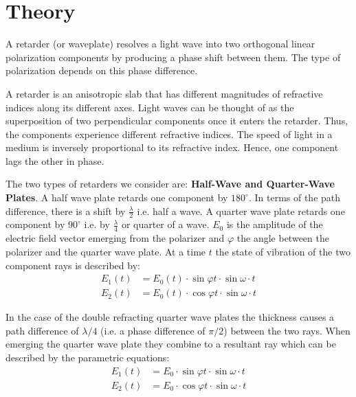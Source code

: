 \documentclass{article}
\begin{document}
\section{Theory}
\noindent 
A retarder (or waveplate) resolves a light wave into two orthogonal linear polarization components by producing a phase shift between them. The type of polarization depends on this phase difference. 
\par
A retarder is an anisotropic slab that has different magnitudes of refractive indices along its different axes. Light waves can be thought of as the superposition of two perpendicular components once it enters the retarder. Thus, the components experience different refractive indices. The speed of light in a medium is inversely proportional to its refractive index. Hence, one component lags the other in phase.
\par
The two types of retarders we consider are: \textbf{Half-Wave and Quarter-Wave Plates}. A half wave plate retards one component by $180^{\circ}$. In terms of the path difference, there is a shift by $\tfrac{\lambda}{2}$ i.e. half a wave.
A quarter wave plate retards one component by $90^{\circ}$ i.e. by $\tfrac{\lambda}{4}$ or quarter of a wave.
$E_0$ is the amplitude of the electric field vector emerging from 
the polarizer and $\varphi$ the angle between the polarizer and the 
quarter wave plate. At a time $t$ the state of vibration of the two 
component rays is described by:
\begin{equation}
    \begin{split}
        E_1 (t) 
        &= E_0 (t) \cdot \sin \varphi t \cdot \sin \omega \cdot t \\
        E_2 (t)
        &= E_0 (t) \cdot \cos \varphi t \cdot \sin \omega \cdot t
    \end{split}
\end{equation}
\par
\noindent
In the case of the double refracting quarter wave plates the 
thickness causes a path difference of $\lambda /4$ (i.e. a phase difference of $\pi /2$) between the two rays. When emerging the quarter wave plate they combine to a resultant ray which can be 
described by the parametric equations:
\begin{equation}
    \begin{split}
        E_1 (t) 
        &= E_0 \cdot \sin \varphi t \cdot \sin \omega \cdot t \\
        E_2 (t)
        &= E_0 \cdot \cos \varphi t \cdot \sin \omega \cdot t
    \end{split}
\end{equation}
\end{document}
